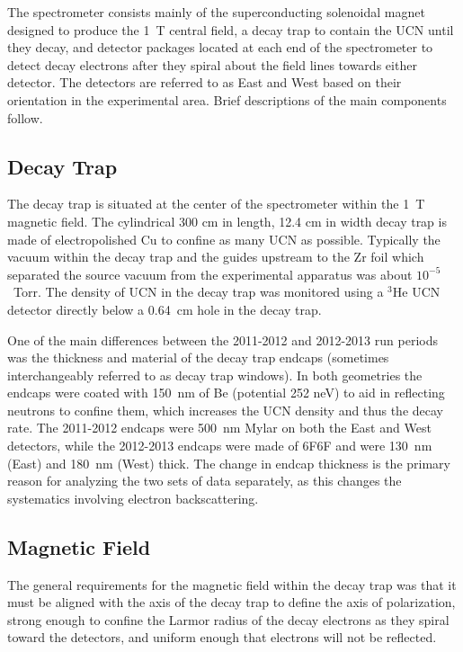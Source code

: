 The spectrometer consists mainly of the superconducting solenoidal magnet designed to produce
the 1~T central field, a decay trap to contain the UCN until they decay, and detector
packages located at each end of the spectrometer to detect decay electrons after they spiral
about the field lines towards either detector. The detectors are referred to as
East and West based on their orientation in the experimental area.
Brief descriptions of the main components follow.

\subsection{Decay Trap}
The decay trap is situated at the center of the spectrometer within the 1~T magnetic
field. The cylindrical 300 cm in length, 12.4 cm in width decay trap is made of electropolished Cu
to confine as many UCN as possible. Typically the vacuum within the decay trap and the guides
upstream to the Zr foil which separated the source vacuum from the experimental apparatus was about
$10^{-5}$~Torr. The density of UCN in the decay trap was monitored using a $^3\mathrm{He}$ UCN detector
directly below a 0.64~cm hole in the decay trap.

One of the main differences between the 2011-2012 and 2012-2013 run periods was the thickness and
material of the decay trap endcaps (sometimes interchangeably referred to as decay trap windows).
In both geometries the endcaps were coated with 150~nm of
Be (potential 252 neV) to aid in reflecting neutrons to confine them, which increases the
UCN density and thus the decay rate. The 2011-2012 endcaps
were 500~nm Mylar on both the East and West detectors, while the 2012-2013 endcaps were made of 6F6F
\cite{hoedl2003} and were 130~nm (East) and 180~nm (West) thick. The change in endcap thickness
is the primary reason for analyzing the two sets of data separately, as this changes the
systematics involving electron backscattering. 

\subsection{Magnetic Field} \label{ssec:MagneticField}

The general requirements for the magnetic field within the decay trap was that it must be aligned with
the axis of the decay trap to define the axis of polarization, strong enough to confine the Larmor
radius of the decay electrons as they spiral toward the detectors, and uniform enough that
electrons will not be reflected.

